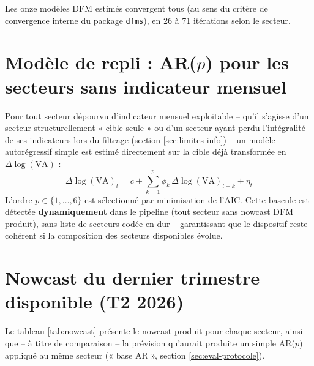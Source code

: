 \documentclass[11pt,a4paper]{report}
\newcommand{\code}[1]{\texttt{#1}}
\newcommand{\dlogva}{$\Delta\log(\mathrm{VA})$}
\begin{document}
Les onze modèles DFM estimés convergent tous (au sens du critère de convergence interne du package \code{dfms}), en 26 à 71 itérations selon le secteur.

\section{Modèle de repli : AR($p$) pour les secteurs sans indicateur mensuel}

Pour tout secteur dépourvu d'indicateur mensuel exploitable -- qu'il s'agisse d'un secteur structurellement « cible seule » ou d'un secteur ayant perdu l'intégralité de ses indicateurs lors du filtrage (section \ref{sec:limites-info}) -- un modèle autorégressif simple est estimé directement sur la cible déjà transformée en \dlogva{} :
\begin{equation}
  \Delta\log(\mathrm{VA})_t = c + \sum_{k=1}^{p} \phi_k \, \Delta\log(\mathrm{VA})_{t-k} + \eta_t
\end{equation}
L'ordre $p \in \{1, \dots, 6\}$ est sélectionné par minimisation de l'AIC. Cette bascule est détectée \textbf{dynamiquement} dans le pipeline (tout secteur sans nowcast DFM produit), sans liste de secteurs codée en dur -- garantissant que le dispositif reste cohérent si la composition des secteurs disponibles évolue.

\section{Nowcast du dernier trimestre disponible (T2 2026)}

Le tableau \ref{tab:nowcast} présente le nowcast produit pour chaque secteur, ainsi que -- à titre de comparaison -- la prévision qu'aurait produite un simple AR($p$) appliqué au même secteur (« base AR », section \ref{sec:eval-protocole}).
\end{document}
